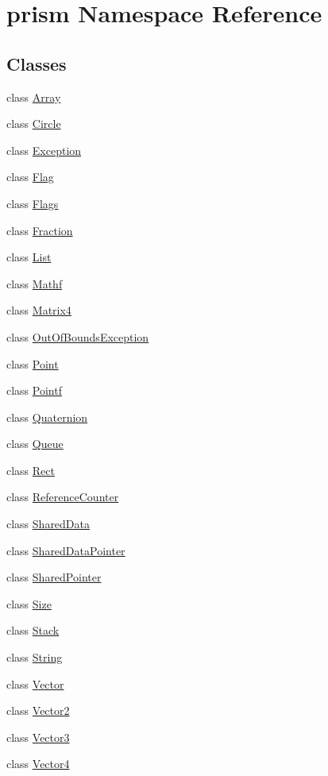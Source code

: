 \hypertarget{namespaceprism}{}\section{prism Namespace Reference}
\label{namespaceprism}
\subsection*{Classes}
\begin{DoxyCompactItemize}
\item 
class \hyperlink{classprism_1_1_array}{Array}
\item 
class \hyperlink{classprism_1_1_circle}{Circle}
\item 
class \hyperlink{classprism_1_1_exception}{Exception}
\item 
class \hyperlink{classprism_1_1_flag}{Flag}
\item 
class \hyperlink{classprism_1_1_flags}{Flags}
\item 
class \hyperlink{classprism_1_1_fraction}{Fraction}
\item 
class \hyperlink{classprism_1_1_list}{List}
\item 
class \hyperlink{classprism_1_1_mathf}{Mathf}
\item 
class \hyperlink{classprism_1_1_matrix4}{Matrix4}
\item 
class \hyperlink{classprism_1_1_out_of_bounds_exception}{Out\+Of\+Bounds\+Exception}
\item 
class \hyperlink{classprism_1_1_point}{Point}
\item 
class \hyperlink{classprism_1_1_pointf}{Pointf}
\item 
class \hyperlink{classprism_1_1_quaternion}{Quaternion}
\item 
class \hyperlink{classprism_1_1_queue}{Queue}
\item 
class \hyperlink{classprism_1_1_rect}{Rect}
\item 
class \hyperlink{classprism_1_1_reference_counter}{Reference\+Counter}
\item 
class \hyperlink{classprism_1_1_shared_data}{Shared\+Data}
\item 
class \hyperlink{classprism_1_1_shared_data_pointer}{Shared\+Data\+Pointer}
\item 
class \hyperlink{classprism_1_1_shared_pointer}{Shared\+Pointer}
\item 
class \hyperlink{classprism_1_1_size}{Size}
\item 
class \hyperlink{classprism_1_1_stack}{Stack}
\item 
class \hyperlink{classprism_1_1_string}{String}
\item 
class \hyperlink{classprism_1_1_vector}{Vector}
\item 
class \hyperlink{classprism_1_1_vector2}{Vector2}
\item 
class \hyperlink{classprism_1_1_vector3}{Vector3}
\item 
class \hyperlink{classprism_1_1_vector4}{Vector4}
\end{DoxyCompactItemize}
